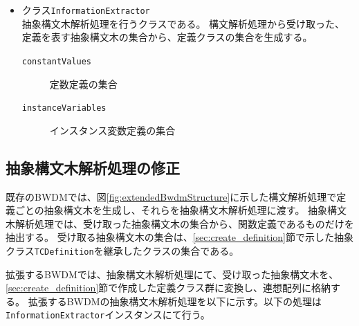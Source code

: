 \documentclass[uplatex, report, a4j, 10pt]{jsbook}
\newcommand\ttt[1]{\texttt{#1}}
\begin{document}
\begin{itemize}
  \item クラス\ttt{InformationExtractor}\\
        抽象構文木解析処理を行うクラスである。
        構文解析処理から受け取った、定義を表す抽象構文木の集合から、定義クラスの集合を生成する。
        \begin{description}
          \item[\ttt{\ttt{constantValues}}] 定数定義の集合
          \item[\ttt{\ttt{instanceVariables}}] インスタンス変数定義の集合
        \end{description}

\end{itemize}

\subsection{抽象構文木解析処理の修正}

既存のBWDMでは、図\ref{fig:extendedBwdmStructure}に示した構文解析処理で定義ごとの抽象構文木を生成し、それらを抽象構文木解析処理に渡す。
抽象構文木解析処理では、受け取った抽象構文木の集合から、関数定義であるものだけを抽出する。
受け取る抽象構文木の集合は、\ref{sec:create_definition}節で示した抽象クラス\ttt{TCDefinition}を継承したクラスの集合である。

拡張するBWDMでは、抽象構文木解析処理にて、受け取った抽象構文木を、\ref{sec:create_definition}節で作成した定義クラス群に変換し、連想配列に格納する。
拡張するBWDMの抽象構文木解析処理を以下に示す。以下の処理は\ttt{InformationExtractor}インスタンスにて行う。
\end{document}
